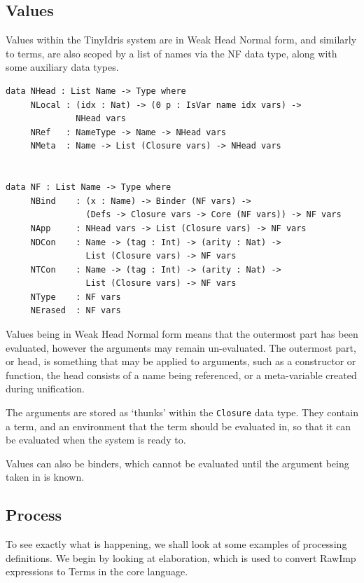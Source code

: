 \documentclass[a4paper]{article}
\begin{document}
\subsection{Values}
\label{sec:org3d64566}
Values within the TinyIdris system are in Weak Head Normal form, and 
similarly to terms, are also scoped by a list of names via the NF data
type, along with some auxiliary data types. 

\begin{center}
\begin{verbatim}
data NHead : List Name -> Type where
	 NLocal : (idx : Nat) -> (0 p : IsVar name idx vars) ->
			  NHead vars
	 NRef   : NameType -> Name -> NHead vars
	 NMeta  : Name -> List (Closure vars) -> NHead vars


data NF : List Name -> Type where
	 NBind    : (x : Name) -> Binder (NF vars) ->
				(Defs -> Closure vars -> Core (NF vars)) -> NF vars
	 NApp     : NHead vars -> List (Closure vars) -> NF vars
	 NDCon    : Name -> (tag : Int) -> (arity : Nat) ->
				List (Closure vars) -> NF vars
	 NTCon    : Name -> (tag : Int) -> (arity : Nat) ->
				List (Closure vars) -> NF vars
	 NType    : NF vars
	 NErased  : NF vars
\end{verbatim}
\end{center}

Values being in Weak Head Normal form means that the outermost part has 
been evaluated, however the arguments may remain un-evaluated. The 
outermost part, or head, is something that may be applied to arguments, 
such as a constructor or function, the head consists of a
name being referenced, or a meta-variable created during unification. 

The arguments are stored as `thunks' within the \texttt{Closure} data type.  
They contain a term, and an environment that the term should be evaluated 
in, so that it can be evaluated when the system is ready to. 

Values can also be binders, which cannot be evaluated until the argument
being taken in is known. 

\subsection{Process}
\label{sec:orgecfa1fe}
To see exactly what is happening, we shall look at some examples of 
processing definitions. We begin by looking at elaboration, which is 
used to convert RawImp expressions to Terms in the core language.
\end{document}
